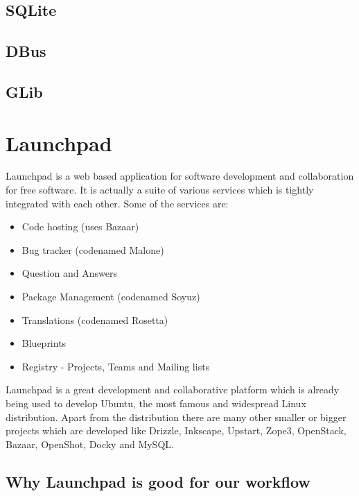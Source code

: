 \subsection{SQLite}
\subsection{DBus}
\subsection{GLib}

\section{Launchpad}

Launchpad is a web based application for software development and collaboration for 
free software. It is actually a suite of various services which is tightly integrated 
with each other. Some of the services are:
\begin{itemize}
\item Code hosting (uses Bazaar)
\item Bug tracker (codenamed Malone)
\item Question and Answers
\item Package Management (codenamed Soyuz)
\item Translations (codenamed Rosetta)
\item Blueprints
\item Registry - Projects, Teams and Mailing lists
\end{itemize}

Launchpad is a great development and collaborative platform which is already being used 
to develop Ubuntu, the most famous and widespread Linux distribution. Apart from the 
distribution there are many other smaller or bigger projects which are developed like 
Drizzle, Inkscape, Upstart, Zope3, OpenStack, Bazaar, OpenShot, Docky and MySQL.

\subsection{Why Launchpad is good for our workflow}
